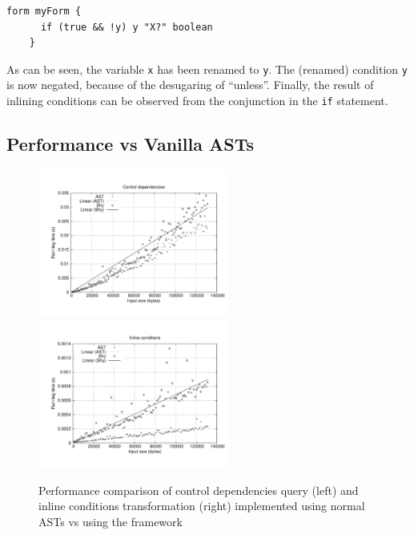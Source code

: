   \begin{lstlisting}[language=ql]
    form myForm {
      if (true && !y) y "X?" boolean
    }
  \end{lstlisting}

  As can be seen, the variable \lstinline{x} has been renamed to \lstinline{y}.
The (renamed) condition \lstinline{y} is now negated, because of the desugaring of ``unless''.
Finally, the result of inlining conditions can be observed from the conjunction in the \lstinline[language=ql]{if} statement.


\subsection{\name Performance vs Vanilla ASTs}

\begin{figure}[t]
  \hspace*{-.1\textwidth}
  \includegraphics[width=0.56\textwidth]{plots/controldeps}
  \includegraphics[width=0.56\textwidth]{plots/inline}
  \caption{Performance comparison of control dependencies query (left) and inline conditions transformation (right) implemented using normal ASTs vs using the \name framework\label{FIG:performance}}
\end{figure}

